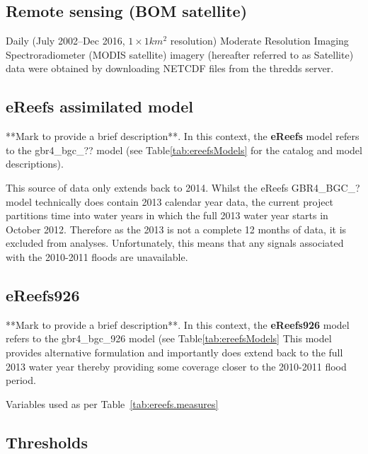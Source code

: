 \clearpage

\subsection{Remote sensing (BOM satellite)}

Daily (July 2002--Dec 2016, $1\times 1 km^2$ resolution) Moderate Resolution Imaging
Spectroradiometer (MODIS satellite) imagery (hereafter referred to as Satellite) data were obtained
by downloading NETCDF files from the thredds server.



 

\subsection{eReefs assimilated model}

**Mark to provide a brief description**. In this context, the \textbf{eReefs} model refers to the
gbr4\_bgc\_?? model (see Table\ref{tab:ereefsModels} for the catalog and model descriptions).

This source of data only extends back to 2014. Whilst the eReefs GBR4\_BGC\_? model technically does
contain 2013 calendar year data, the current project partitions time into water years in which the
full 2013 water year starts in October 2012.  Therefore as the 2013 is not a complete 12 months of
data, it is excluded from analyses. Unfortunately, this means that any signals associated with the
2010-2011 floods are unavailable.
 
    
      

\subsection{eReefs926}

**Mark to provide a brief description**. In this context, the \textbf{eReefs926} model refers to the
gbr4\_bgc\_926 model (see Table\ref{tab:ereefsModels} This model provides alternative formulation
and importantly does extend back to the full 2013 water year thereby providing some coverage closer
to the 2010-2011 flood period.

Variables used as per Table~\ref{tab:ereefs.measures}

\subsection{Thresholds}

